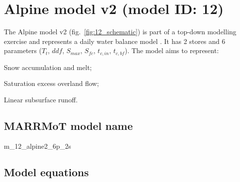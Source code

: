 \section{Alpine model v2 (model ID: 12)}
The Alpine model v2 (fig.~\ref{fig:12_schematic}) is part of a top-down modelling exercise and represents a daily water balance model \citep{Eder2003}. It has 2 stores and 6 parameters ($T_t$, $ddf$, $S_{max}$, $S_{fc}$, $t_{c,in}$, $t_{c,bf}$). The model aims to represent:

\begin{itemizecompact}
\item Snow accumulation and melt;
\item Saturation excess overland flow;
\item Linear subsurface runoff.
\end{itemizecompact}

\subsection{MARRMoT model name}
m\_12\_alpine2\_6p\_2s \\

\subsection{Model equations}

